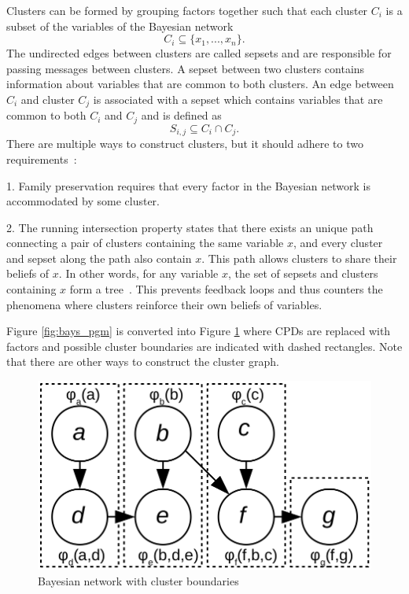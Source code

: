 \documentclass[12pt,oneside,openany,a4paper, %
afrikaans,english,
]{memoir}
\numberwithin{equation}{chapter}
\begin{document}
{Clusters can be formed by grouping factors together such that each cluster $C_i$ is a subset of the variables of the Bayesian network
\begin{equation}
C_i \subseteq \{x_1, ..., x_n\}.
\end{equation}
The undirected edges between clusters are called sepsets and are responsible for passing messages between clusters. A sepset between two clusters contains information about variables that are common to both clusters. An edge between $C_i$ and cluster $C_j$ is associated with a sepset which contains variables that are common to both $C_i$ and $C_j$ and is defined as
\begin{equation}
S_{i,j} \subseteq C_i \cap C_j.
\end{equation}
There are multiple ways to construct clusters, but it should adhere to two requirements~\citep{koller}:

1. Family preservation requires that every factor in the Bayesian network is accommodated by some cluster.

2. The running intersection property states that there exists an unique path connecting a pair of clusters containing the same variable $x$, and every cluster and sepset along the path also contain $x$. This path allows clusters to share their beliefs of $x$. In other words, for any variable $x$, the set of sepsets and clusters containing $x$ form a tree~\citep{koller}. This prevents feedback loops and thus counters the phenomena where clusters reinforce their own beliefs of variables.

Figure \ref{fig:bays_pgm} is converted into Figure \ref{fig:cluster_bound} where CPDs are replaced with factors and possible cluster boundaries are indicated with dashed rectangles. Note that there are other ways to construct the cluster graph.
\begin{figure}[H]
  \includegraphics[width=0.6\linewidth]{Figures/cluster_divisions.png}
  \centering
  \caption{Bayesian network with cluster boundaries}
  \label{fig:cluster_bound}
\end{figure}

}
\end{document}
